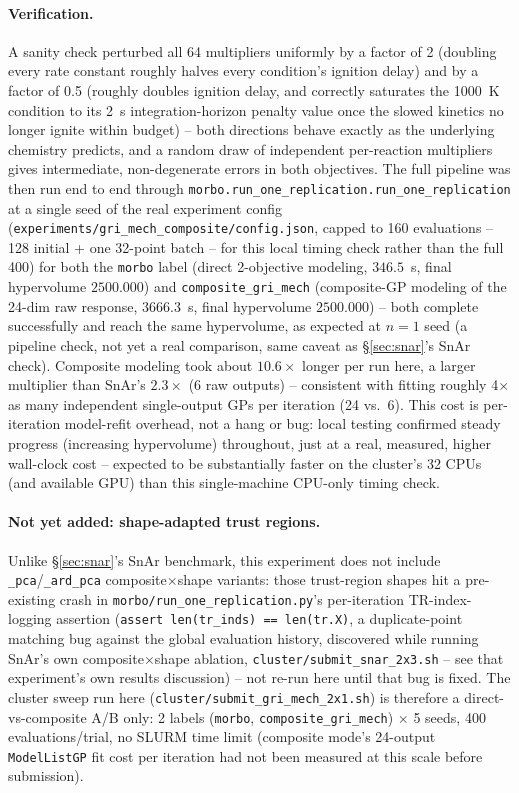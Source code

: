 \documentclass[11pt]{article}
\begin{document}
\paragraph{Verification.} A sanity check perturbed all 64 multipliers
uniformly by a factor of 2 (doubling every rate constant roughly halves
every condition's ignition delay) and by a factor of 0.5 (roughly doubles
ignition delay, and correctly saturates the 1000~K condition to its
2~s integration-horizon penalty value once the slowed kinetics no longer
ignite within budget) -- both directions behave exactly as the
underlying chemistry predicts, and a random draw of independent
per-reaction multipliers gives intermediate, non-degenerate errors in
both objectives. The full pipeline was then run end to end through
\texttt{morbo.run\_one\_replication.\allowbreak run\_one\_replication} at a
single seed of the real experiment config
(\texttt{experiments/gri\_mech\_composite/config.json}, capped to 160
evaluations -- 128 initial + one 32-point batch -- for this local timing
check rather than the full 400) for both the \texttt{morbo} label (direct
2-objective modeling, $346.5$~s, final hypervolume $2500.000$) and
\texttt{composite\_gri\_mech} (composite-GP modeling of the 24-dim raw
response, $3666.3$~s, final hypervolume $2500.000$) -- both complete
successfully and reach the same hypervolume, as expected at $n=1$ seed
(a pipeline check, not yet a real comparison, same caveat as
\S\ref{sec:snar}'s SnAr check). Composite modeling took about
$10.6\times$ longer per run here, a larger multiplier than SnAr's
$2.3\times$ (6 raw outputs) -- consistent with fitting roughly 4$\times$
as many independent single-output GPs per iteration (24 vs.\ 6). This
cost is per-iteration model-refit overhead, not a hang or bug: local
testing confirmed steady progress (increasing hypervolume) throughout,
just at a real, measured, higher wall-clock cost -- expected to be
substantially faster on the cluster's 32 CPUs (and available GPU) than
this single-machine CPU-only timing check.

\paragraph{Not yet added: shape-adapted trust regions.} Unlike
\S\ref{sec:snar}'s SnAr benchmark, this experiment does not include
\texttt{\_pca}/\texttt{\_ard\_pca} composite$\times$shape variants: those
trust-region shapes hit a pre-existing crash in
\texttt{morbo/run\_one\_replication.py}'s per-iteration TR-index-logging
assertion (\texttt{assert len(tr\_inds) == len(tr.X)}, a duplicate-point
matching bug against the global evaluation history, discovered while
running SnAr's own composite$\times$shape ablation,
\texttt{cluster/submit\_snar\_2x3.sh} -- see that experiment's own results
discussion) -- not re-run here until that bug is fixed. The cluster sweep
run here (\texttt{cluster/submit\_gri\_mech\_2x1.sh}) is therefore a
direct-vs-composite A/B only: 2 labels (\texttt{morbo},
\texttt{composite\_gri\_mech}) $\times$ 5 seeds, 400 evaluations/trial,
no SLURM time limit (composite mode's 24-output \texttt{ModelListGP} fit
cost per iteration had not been measured at this scale before
submission).
\end{document}

